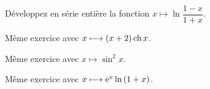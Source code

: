 \begin{exo}
Développez en série entière la fonction \(x\mapsto\ln\dfrac{1-x}{1+x}\).
\end{exo}

\begin{exo}
Même exercice avec \(x\longmapsto\left(x+2\right)\operatorname{ch} x\).
\end{exo}

\begin{exo}
Même exercice avec \(x\mapsto\sin^2x\).
\end{exo}

\begin{exo}
Même exercice avec \(x\longmapsto\mathrm{e}^{x}\ln\left(1+x\right)\).
\end{exo}
